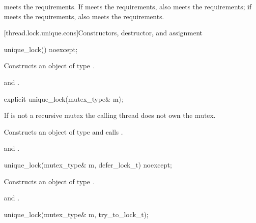 \pnum
\begin{note}  meets the  requirements. If 
meets the  requirements,
 also meets the  requirements;
if 
meets the  requirements,
 also meets the  requirements. \end{note}

[thread.lock.unique.cons]{Constructors, destructor, and assignment}

%
\begin{itemdecl}
unique_lock() noexcept;
\end{itemdecl}

\begin{itemdescr}
\pnum
\effects Constructs an object of type .

\pnum
\ensures {} and .
\end{itemdescr}

%
\begin{itemdecl}
explicit unique_lock(mutex_type& m);
\end{itemdecl}

\begin{itemdescr}
\pnum
\requires If  is not a recursive mutex the calling thread does not own the mutex.

\pnum
\effects Constructs an object of type  and calls .

\pnum
\ensures {} and .
\end{itemdescr}

%
\begin{itemdecl}
unique_lock(mutex_type& m, defer_lock_t) noexcept;
\end{itemdecl}

\begin{itemdescr}
\pnum
\effects Constructs an object of type .

\pnum
\ensures {} and .
\end{itemdescr}

%
\begin{itemdecl}
unique_lock(mutex_type& m, try_to_lock_t);
\end{itemdecl}

